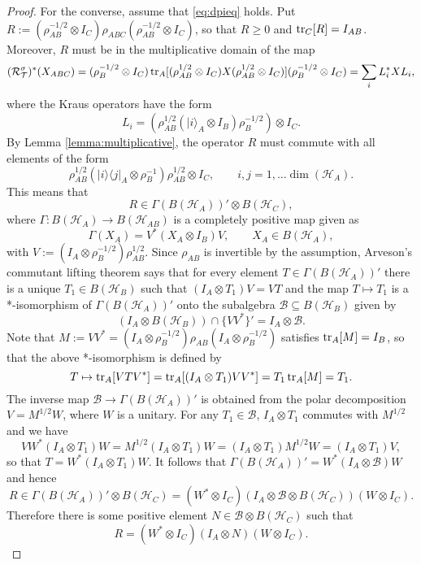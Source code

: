 \documentclass[11pt]{article}
\theoremstyle{newdefinition}
\theoremstyle{newplain}
\theoremstyle{myplain}
\DeclareMathOperator{\1}{\mathds{1}}
\begin{document}
{\begin{proof}
For the converse, assume that \eqref{eq:dpieq} holds. Put $R:=(\rho_{AB}^{-1/2}\otimes
I_C)\rho_{ABC}(\rho_{AB}^{-1/2}\otimes I_C)$, so that $R\ge 0$ and $\tr_C[R]=I_{AB}$.
Moreover,  $R$ must be in the multiplicative domain of the map
\[
(\mathcal {R}_{\mathcal {T}}^\sigma)^*(X_{ABC})=(\rho_B^{-1/2}\otimes
I_C)\tr_A[(\rho_{AB}^{1/2}\otimes I_C)X(\rho_{AB}^{1/2}\otimes I_C)](\rho_B^{-1/2}\otimes
I_C)=\sum_i L_i^*XL_i,
\]
where the Kraus operators have the form
\[
L_i=(\rho_{AB}^{1/2}(|i\rangle_A\otimes I_B)\rho_B^{-1/2})\otimes I_C.
\]
By Lemma \ref{lemma:multiplicative}, the operator $R$ must commute with all elements of
the form 
\[
\rho_{AB}^{1/2}(|i\rangle\langle j|_A\otimes \rho_B^{-1})\rho_{AB}^{1/2}\otimes I_C,\qquad
i,j=1,\dots\dim(\mathcal {H}_A).
\]
This means that  
\[
R\in\Gamma(B(\mathcal {H}_A))' \otimes B(\mathcal{H}_C),
\]
where  $\Gamma: B(\mathcal {H}_A)\to
B(\mathcal {H}_{AB})$ is a completely
positive map given as 
\[
\Gamma(X_A)=V^*(X_A\otimes I_B)V,\qquad X_A\in B(\mathcal {H}_A),
\]
with $V:=(I_A\otimes \rho_B^{-1/2})\rho_{AB}^{1/2}$. Since  $\rho_{AB}$ is invertible by
the assumption,  Arveson's commutant lifting
theorem \cite[Thm. 1.3.1]{arveson1969subalgebras} says that  for every element $T\in \Gamma(B(\mathcal {H}_A))'$ there is a unique
$T_1\in B(\mathcal{H}_B)$ such that $(I_A\otimes T_1)V=VT$ and the map $T\mapsto T_1$ is a
*-isomorphism of $\Gamma(B(\mathcal {H}_A))'$ onto the subalgebra $\mathcal B\subseteq
B(\mathcal{H}_B)$ given by
\[
(I_A\otimes B(\mathcal {H}_B))\cap \{VV^*\}'=I_A\otimes \mathcal{B}.
\]
Note that $M:=VV^*=(I_A\otimes \rho_B^{-1/2})\rho_{AB}(I_A\otimes \rho_B^{-1/2})$
satisfies $\tr_A[M]=I_B$, so that the above *-isomorphism is defined by
\[
T\mapsto \tr_A [VTV^*]=\tr_A[(I_A\otimes T_1)VV^*]=T_1\tr_A [M]=T_1.
\]
The inverse map $\mathcal {B}\to\Gamma(B(\mathcal {H}_A))' $ is obtained from the polar decomposition  $V=M^{1/2}W$,
where  $W$ is a unitary. For any $T_1\in \mathcal {B}$, $I_A\otimes T_1$ commutes with $M^{1/2}$ and we have
\[
VW^*(I_A\otimes T_1)W=M^{1/2}(I_A\otimes T_1)W=(I_A\otimes T_1)M^{1/2}W=(I_A\otimes T_1)V,
\]
so that $T=W^*(I_A\otimes T_1)W$. It follows that $\Gamma(B(\mathcal
{H}_A))'=W^*(I_A\otimes \mathcal{B})W$ and hence
\[
R\in \Gamma(B(\mathcal {H}_A))'\otimes B(\mathcal{H}_C)=(W^*\otimes I_C)(I_A\otimes
\mathcal{B}\otimes B(\mathcal{H}_C))(W\otimes I_C). 
\]
Therefore  there is some positive element $N\in \mathcal{B}\otimes B(\mathcal{H}_C)$ such that 
\begin{equation}\label{eq:R}
R=(W^*\otimes I_C)(I_A\otimes N)(W\otimes I_C).
\end{equation}

\end{proof}}
\end{document}
